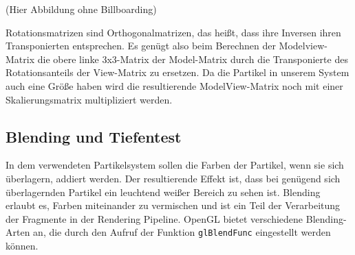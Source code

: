 (Hier Abbildung ohne Billboarding)

Rotationsmatrizen sind Orthogonalmatrizen, das heißt, dass ihre Inversen ihren Transponierten entsprechen. Es genügt also beim Berechnen der Modelview-Matrix die obere linke 3x3-Matrix der Model-Matrix durch die Transponierte des Rotationsanteils der View-Matrix zu ersetzen. Da die Partikel in unserem System auch eine Größe haben wird die
resultierende ModelView-Matrix noch mit einer Skalierungsmatrix multipliziert werden.

\subsection{Blending und Tiefentest}
\label{Kapitel_2_-_Unterkapitel_1.4}
%
In dem verwendeten Partikelsystem sollen die Farben der Partikel, wenn sie sich überlagern, addiert werden. Der resultierende Effekt ist, dass bei genügend sich überlagernden Partikel ein leuchtend weißer Bereich zu sehen ist. Blending erlaubt es, Farben miteinander zu vermischen und ist ein Teil der Verarbeitung der Fragmente in der Rendering Pipeline. OpenGL bietet verschiedene Blending-Arten an, die durch den Aufruf der Funktion {\texttt{glBlendFunc}} eingestellt werden können. 


